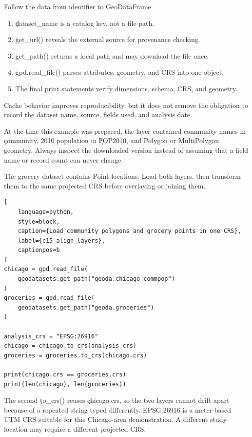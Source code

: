\begin{SyntaxBox}{Follow the data from identifier to GeoDataFrame}
\begin{enumerate}
    \item \c{dataset_name} is a catalog key, not a file path.
    \item \c{get_url()} reveals the external source for provenance checking.
    \item \c{get_path()} returns a local path and may download the file once.
    \item \c{gpd.read_file()} parses attributes, geometry, and CRS into one object.
    \item The final print statements verify dimensions, schema, CRS, and geometry.
\end{enumerate}
Cache behavior improves reproducibility, but it does not remove the obligation
to record the dataset name, source, fields used, and analysis date.
\end{SyntaxBox}

At the time this example was prepared, the layer contained community names in
\c{community}, 2010 population in \c{POP2010}, and Polygon or MultiPolygon
geometry. Always inspect the downloaded version instead of assuming that a
field name or record count can never change.


The grocery dataset contains Point locations. Load both layers, then transform
them to the same projected CRS before overlaying or joining them.

\begin{lstlisting}[
    language=python,
    style=block,
    caption={Load community polygons and grocery points in one CRS},
    label={c15_align_layers},
    captionpos=b
]
chicago = gpd.read_file(
    geodatasets.get_path("geoda.chicago_commpop")
)
groceries = gpd.read_file(
    geodatasets.get_path("geoda.groceries")
)

analysis_crs = "EPSG:26916"
chicago = chicago.to_crs(analysis_crs)
groceries = groceries.to_crs(chicago.crs)

print(chicago.crs == groceries.crs)
print(len(chicago), len(groceries))
\end{lstlisting}

The second \c{to_crs()} reuses \c{chicago.crs}, so the two layers cannot drift
apart because of a repeated string typed differently. EPSG:26916 is a
meter-based UTM CRS suitable for this Chicago-area demonstration. A different
study location may require a different projected CRS.

